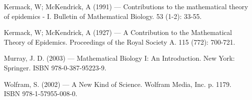 %
%
% 
% 
%

\begin{thebibliography}{99.}

 Kermack, W; McKendrick, A (1991) --- Contributions to the mathematical theory of epidemics - I. Bulletin of Mathematical Biology. 53 (1-2): 33-55.

 Kermack, W; McKendrick, A (1927) --- A Contribution to the Mathematical Theory of Epidemics. Proceedings of the Royal Society A. 115 (772): 700-721.

 Murray, J. D. (2003) --- Mathematical Biology I: An Introduction. 
New York: Springer. ISBN 978-0-387-95223-9.

 Wolfram, S. (2002) --- A New Kind of Science. 
Wolfram Media, Inc. p. 1179. ISBN 978-1-57955-008-0.

\end{thebibliography}
